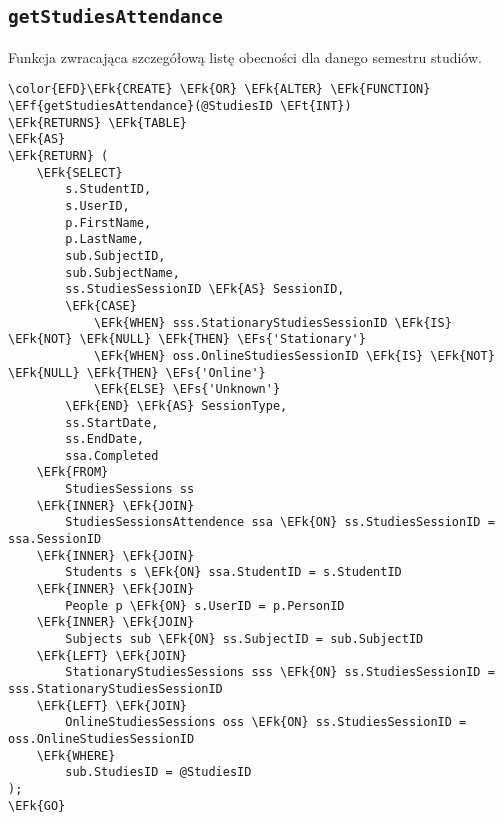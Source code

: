 \documentclass[11pt]{article}
\newcommand{\EFs}[1]{\textcolor{EFs}{#1}} %
\newcommand{\EFk}[1]{\textcolor{EFk}{\textbf{#1}}} %
\newcommand{\EFf}[1]{\textcolor{EFf}{#1}} %
\newcommand{\EFt}[1]{\textcolor{EFt}{\textbf{#1}}} %
\begin{document}
\subsection{\texttt{getStudiesAttendance}}
\label{sec:orgf965cc2}
Funkcja zwracająca szczegółową listę obecności dla danego semestru studiów.
\begin{Code}
\begin{Verbatim}
\color{EFD}\EFk{CREATE} \EFk{OR} \EFk{ALTER} \EFk{FUNCTION} \EFf{getStudiesAttendance}(@StudiesID \EFt{INT})
\EFk{RETURNS} \EFk{TABLE}
\EFk{AS}
\EFk{RETURN} (
    \EFk{SELECT} 
        s.StudentID, 
        s.UserID, 
        p.FirstName, 
        p.LastName, 
        sub.SubjectID, 
        sub.SubjectName, 
        ss.StudiesSessionID \EFk{AS} SessionID,
        \EFk{CASE}
            \EFk{WHEN} sss.StationaryStudiesSessionID \EFk{IS} \EFk{NOT} \EFk{NULL} \EFk{THEN} \EFs{'Stationary'}
            \EFk{WHEN} oss.OnlineStudiesSessionID \EFk{IS} \EFk{NOT} \EFk{NULL} \EFk{THEN} \EFs{'Online'}
            \EFk{ELSE} \EFs{'Unknown'}
        \EFk{END} \EFk{AS} SessionType,
        ss.StartDate, 
        ss.EndDate, 
        ssa.Completed
    \EFk{FROM} 
        StudiesSessions ss
    \EFk{INNER} \EFk{JOIN} 
        StudiesSessionsAttendence ssa \EFk{ON} ss.StudiesSessionID = ssa.SessionID
    \EFk{INNER} \EFk{JOIN} 
        Students s \EFk{ON} ssa.StudentID = s.StudentID
    \EFk{INNER} \EFk{JOIN} 
        People p \EFk{ON} s.UserID = p.PersonID
    \EFk{INNER} \EFk{JOIN} 
        Subjects sub \EFk{ON} ss.SubjectID = sub.SubjectID
    \EFk{LEFT} \EFk{JOIN} 
        StationaryStudiesSessions sss \EFk{ON} ss.StudiesSessionID = sss.StationaryStudiesSessionID
    \EFk{LEFT} \EFk{JOIN} 
        OnlineStudiesSessions oss \EFk{ON} ss.StudiesSessionID = oss.OnlineStudiesSessionID
    \EFk{WHERE} 
        sub.StudiesID = @StudiesID
);
\EFk{GO}
\end{Verbatim}
\end{Code}
\end{document}
